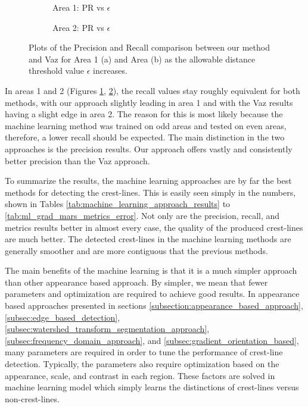 \begin{figure}
	\centering
	\begin{subfigure}{0.48\textwidth}
		\centering
		\caption{ Area 1: PR vs $\epsilon$}
		\label{fig:precision_recall_vs_epsilon_area1}
	\end{subfigure}
	\begin{subfigure}{0.48\textwidth}
		\centering
		\caption{ Area 2: PR vs $\epsilon$}
		\label{fig:precision_recall_vs_epsilon_area2}
	\end{subfigure}
	\caption{ Plots of the Precision and Recall comparison between our method and Vaz \cite{vaz_object_based_dune_analysis} for Area 1 (a) and Area (b) as the allowable distance threshold value $\epsilon$ increases. }
	\label{fig:precision_recall_vs_epsilon}
\end{figure}

In areas 1 and 2 (Figures \ref{fig:precision_recall_vs_epsilon_area1}, \ref{fig:precision_recall_vs_epsilon_area2}), the recall values stay roughly equivalent for both methods, with our approach slightly leading in area 1 and with the Vaz results having a slight edge in area 2. The reason for this is most likely because the machine learning method was trained on odd areas and tested on even areas, therefore, a lower recall should be expected. The main distinction in the two approaches is the precision results. Our approach offers vastly and consistently better precision than the Vaz approach.

To summarize the results, the machine learning approaches are by far the best methods for detecting the crest-lines. This is easily seen simply in the numbers, shown in Tables \ref{tab:machine_learning_approach_results} to \ref{tab:ml_grad_mars_metrics_error}. Not only are the precision, recall, and metrics results better in almost every case, the quality of the produced crest-lines are much better. The detected crest-lines in the machine learning methods are generally smoother and are more contiguous that the previous methods.

The main benefits of the machine learning is that it is a much simpler approach than other appearance based approach. By simpler, we mean that fewer parameters and optimization are required to achieve good results. In appearance based approaches presented in sections \ref{subsection:appearance_based_approach}, \ref{subsec:edge_based_detection}, \ref{subsec:watershed_transform_segmentation_approach}, \ref{subsec:frequency_domain_approach}, and \ref{subsec:gradient_orientation_based}, many parameters are required in order to tune the performance of crest-line detection. Typically, the parameters also require optimization based on the appearance, scale, and contrast in each region. These factors are solved in machine learning model which simply learns the distinctions of crest-lines versus non-crest-lines.

